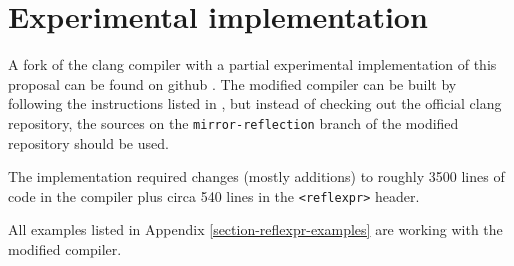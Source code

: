 \section{Experimental implementation}

A fork of the clang compiler with a partial experimental implementation
of this proposal can be found on github \cite{clang-reflexpr-impl}.
The modified compiler can be built by following the instructions listed
in \cite{clang-getting-started}, but instead of checking out the official clang
repository, the sources on the \texttt{mirror-reflection} branch of the modified
repository should be used.

The implementation required changes (mostly additions) to roughly 3500 lines
of code in the compiler plus circa 540 lines in the \texttt{<reflexpr>} header.

All examples listed in Appendix \ref{section-reflexpr-examples} are working with
the modified compiler.
